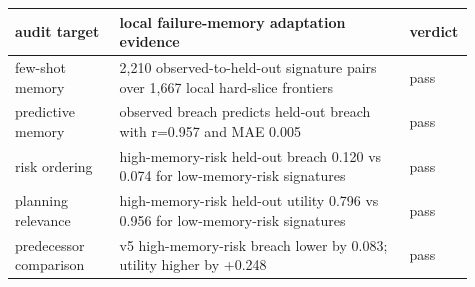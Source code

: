 \begin{tabular}{p{0.22\linewidth}p{0.61\linewidth}p{0.08\linewidth}}
\toprule
audit target & local failure-memory adaptation evidence & verdict \\
\midrule
few-shot memory & 2,210 observed-to-held-out signature pairs over 1,667 local hard-slice frontiers & pass \\
predictive memory & observed breach predicts held-out breach with r=0.957 and MAE 0.005 & pass \\
risk ordering & high-memory-risk held-out breach 0.120 vs 0.074 for low-memory-risk signatures & pass \\
planning relevance & high-memory-risk held-out utility 0.796 vs 0.956 for low-memory-risk signatures & pass \\
predecessor comparison & v5 high-memory-risk breach lower by 0.083; utility higher by +0.248 & pass \\
\bottomrule
\end{tabular}
